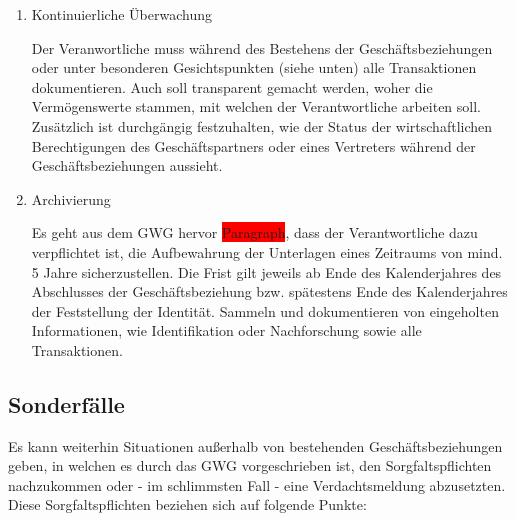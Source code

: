 \documentclass{article}
\begin{document}
        \begin{enumerate}

            \item Kontinuierliche Überwachung

                Der Veranwortliche muss während des Bestehens der Geschäftsbeziehungen oder unter besonderen Gesichtspunkten (siehe unten) alle Transaktionen dokumentieren. Auch soll transparent gemacht werden, woher die Vermögenswerte stammen, mit welchen der Verantwortliche arbeiten soll.
                Zusätzlich ist durchgängig festzuhalten, wie der Status der wirtschaftlichen Berechtigungen des Geschäftspartners oder eines Vertreters während der Geschäftsbeziehungen aussieht.

            \item Archivierung

                Es geht aus dem GWG hervor \colorbox{red}{Paragraph}, dass der Verantwortliche dazu verpflichtet ist, die Aufbewahrung der Unterlagen eines Zeitraums von mind. 5 Jahre sicherzustellen.
                Die Frist gilt jeweils ab Ende des Kalenderjahres des Abschlusses der Geschäftsbeziehung bzw. spätestens Ende des Kalenderjahres der Feststellung der Identität.
                Sammeln und dokumentieren von eingeholten Informationen, wie Identifikation oder Nachforschung sowie alle Transaktionen.

        \end{enumerate}  


        \subsection[Sonderfälle]{Sonderfälle}

        Es kann weiterhin Situationen außerhalb von bestehenden Geschäftsbeziehungen geben, in welchen es durch das GWG vorgeschrieben ist, den Sorgfaltspflichten nachzukommen oder - im schlimmsten Fall - eine Verdachtsmeldung abzusetzten. Diese Sorgfaltspflichten beziehen sich auf folgende Punkte:
\end{document}
